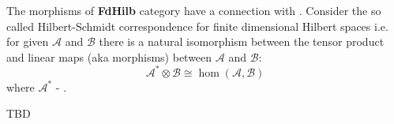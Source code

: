 The morphisms of \textbf{FdHilb} category have a connection with
. Consider the so called Hilbert-Schmidt
correspondence for finite dimensional Hilbert spaces i.e. for given
$\mathcal{A}$ and $\mathcal{B}$ there is a natural isomorphism between
the tensor product and linear maps (aka morphisms) between
$\mathcal{A}$ and $\mathcal{B}$:
\[
\mathcal{A}^\ast \otimes \mathcal{B} \cong \hom(\mathcal{A}, \mathcal{B})
\]
where $\mathcal{A}^\ast$ - .


TBD
